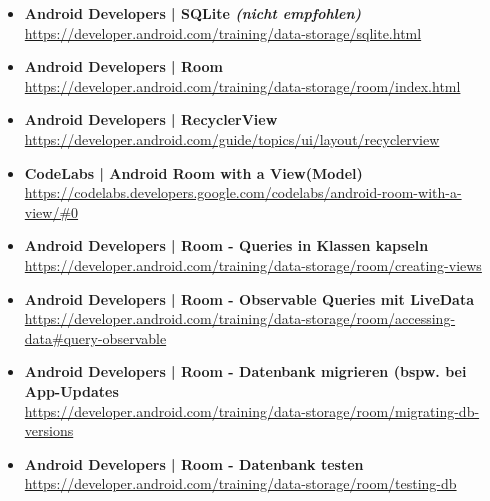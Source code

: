 \documentclass[a4paper]{article}
\begin{document}
{\begin{itemize}
		\item \textbf{Android Developers | SQLite \textit{(nicht empfohlen)}}\\
		\href{https://developer.android.com/training/data-storage/sqlite.html}
		{https://developer.android.com/training/data-storage/sqlite.html}
		
		\item \textbf{Android Developers | Room}\\
		\href{https://developer.android.com/training/data-storage/room/index.html}
		{https://developer.android.com/training/data-storage/room/index.html}
		
		\item \textbf{Android Developers | RecyclerView}\\
		\href{https://developer.android.com/guide/topics/ui/layout/recyclerview}
		{https://developer.android.com/guide/topics/ui/layout/recyclerview}
		
		\item \textbf{CodeLabs | Android Room with a View(Model)}\\
		\href{https://codelabs.developers.google.com/codelabs/android-room-with-a-view/#0}
		{https://codelabs.developers.google.com/codelabs/android-room-with-a-view/\#0}
		
		\item \textbf{Android Developers | Room - Queries in Klassen kapseln}\\
		\href{https://developer.android.com/training/data-storage/room/creating-views}
		{https://developer.android.com/training/data-storage/room/creating-views}
		
		\item \textbf{Android Developers | Room - Observable Queries mit LiveData}\\
		\href{https://developer.android.com/training/data-storage/room/accessing-data#query-observable}
		{https://developer.android.com/training/data-storage/room/accessing-data\#query-observable}
		
		\item \textbf{Android Developers | Room - Datenbank migrieren (bspw. bei App-Updates}\\
		\href{https://developer.android.com/training/data-storage/room/migrating-db-versions}
		{https://developer.android.com/training/data-storage/room/migrating-db-versions}
		
		\item \textbf{Android Developers | Room - Datenbank testen}\\
		\href{https://developer.android.com/training/data-storage/room/testing-db}
		{https://developer.android.com/training/data-storage/room/testing-db}
		

\end{itemize}}
\end{document}
